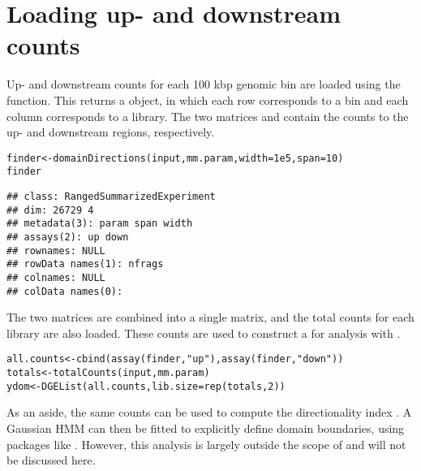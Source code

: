 \documentclass{report}\usepackage[]{graphicx}\usepackage[usenames,dvipsnames]{color}
\newcommand{\hlnum}[1]{\textcolor[rgb]{0.816,0.125,0.439}{#1}}%
\newcommand{\hlstr}[1]{\textcolor[rgb]{0.251,0.627,0.251}{#1}}%
\newcommand{\hlstd}[1]{\textcolor[rgb]{0.251,0.251,0.251}{#1}}%
\newcommand{\hlkwb}[1]{\textcolor[rgb]{0,0,0}{#1}}%
\newcommand{\hlkwc}[1]{\textcolor[rgb]{0.251,0.251,0.251}{#1}}%
\newcommand{\hlkwd}[1]{\textcolor[rgb]{0.878,0.439,0.125}{#1}}%
\newenvironment{knitrout}{}{} %
\begin{document}
\section{Loading up- and downstream counts}
Up- and downstream counts for each 100 kbp genomic bin are loaded using the  function.
This returns a  object, in which each row corresponds to a bin and each column corresponds to a library.
The two matrices  and  contain the counts to the up- and downstream regions, respectively.

\begin{knitrout}
\color{fgcolor}\begin{kframe}
\begin{alltt}
\hlstd{finder} \hlkwb{<-} \hlkwd{domainDirections}\hlstd{(input, mm.param,} \hlkwc{width}\hlstd{=}\hlnum{1e5}\hlstd{,} \hlkwc{span}\hlstd{=}\hlnum{10}\hlstd{)}
\hlstd{finder}
\end{alltt}
\begin{verbatim}
## class: RangedSummarizedExperiment 
## dim: 26729 4 
## metadata(3): param span width
## assays(2): up down
## rownames: NULL
## rowData names(1): nfrags
## colnames: NULL
## colData names(0):
\end{verbatim}
\end{kframe}
\end{knitrout}

The two matrices are combined into a single matrix, and the total counts for each library are also loaded.
These counts are used to construct a  for analysis with . 

\begin{knitrout}
\color{fgcolor}\begin{kframe}
\begin{alltt}
\hlstd{all.counts} \hlkwb{<-} \hlkwd{cbind}\hlstd{(}\hlkwd{assay}\hlstd{(finder,} \hlstr{"up"}\hlstd{),} \hlkwd{assay}\hlstd{(finder,} \hlstr{"down"}\hlstd{))}
\hlstd{totals} \hlkwb{<-} \hlkwd{totalCounts}\hlstd{(input, mm.param)}
\hlstd{ydom} \hlkwb{<-} \hlkwd{DGEList}\hlstd{(all.counts,} \hlkwc{lib.size}\hlstd{=}\hlkwd{rep}\hlstd{(totals,} \hlnum{2}\hlstd{))}
\end{alltt}
\end{kframe}
\end{knitrout}

As an aside, the same counts can be used to compute the directionality index \cite{dixon2012topological}. 
A Gaussian HMM can then be fitted to explicitly define domain boundaries, using packages like .
However, this analysis is largely outside the scope of  and will not be discussed here.
\end{document}

